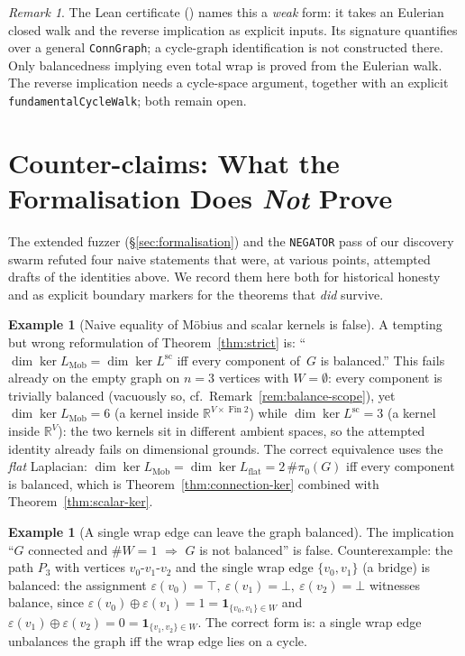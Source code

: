 \documentclass[11pt,a4paper]{amsart}
\theoremstyle{plain}
\theoremstyle{definition}
\newtheorem{example}[theorem]{Example}
\theoremstyle{remark}
\newtheorem{remark}[theorem]{Remark}
\DeclareMathOperator{\Ker}{ker}
\newcommand{\RR}{\mathbb{R}}
\newcommand{\Lscalar}{L^{\operatorname{sc}}}
\newcommand{\comp}{\pi_0}
\begin{document}
\begin{remark}\label{rem:cycle-ew-lean}
The Lean certificate
() names this a \emph{weak} form: it
takes an Eulerian closed walk and the reverse implication as explicit
inputs. Its signature quantifies over a general \texttt{ConnGraph};
a cycle-graph identification is not constructed there.
Only balancedness implying even total wrap is proved from the Eulerian
walk. The reverse implication needs a cycle-space argument, together
with an explicit \texttt{fundamentalCycleWalk}; both remain open.
\end{remark}

\section{Counter-claims: What the Formalisation Does
\emph{Not} Prove}\label{sec:counter}

The extended fuzzer (\S\ref{sec:formalisation}) and the
\texttt{NEGATOR} pass of our discovery swarm refuted four naive
statements that were, at various points, attempted drafts of the
identities above. We record them here both for historical honesty
and as explicit boundary markers for the theorems that \emph{did}
survive.

\begin{example}[Naive equality of M\"obius and scalar kernels is
false]\label{ex:naive-eq}
A tempting but wrong reformulation of Theorem~\ref{thm:strict} is:
``$\dim\Ker L_{\mathrm{Mob}} = \dim\Ker \Lscalar$ iff
every component of~$G$ is balanced.'' This fails already on the
empty graph on $n=3$ vertices with $W=\emptyset$: every
component is trivially balanced (vacuously so, cf.\
Remark~\ref{rem:balance-scope}), yet
$\dim\Ker L_{\mathrm{Mob}} = 6$ (a kernel inside
$\RR^{V\times\operatorname{Fin}2}$) while
$\dim\Ker \Lscalar = 3$ (a kernel inside $\RR^{V}$): the
two kernels sit in different ambient spaces, so the attempted
identity already fails on dimensional grounds. The correct
equivalence uses
the \emph{flat} Laplacian: $\dim\Ker L_{\mathrm{Mob}} =
\dim\Ker L_{\mathrm{flat}} = 2\,\#\comp(G)$ iff every component is
balanced, which is Theorem~\ref{thm:connection-ker} combined with
Theorem~\ref{thm:scalar-ker}.
\end{example}

\begin{example}[A single wrap edge can leave the graph
balanced]\label{ex:bridge-wrap}
The implication ``$G$ connected and $\#W=1$ $\Rightarrow$ $G$ is not
balanced'' is false. Counterexample: the path $P_3$ with vertices
$v_0\text{-}v_1\text{-}v_2$ and the single wrap edge
$\{v_0,v_1\}$ (a bridge) is balanced: the assignment
$\varepsilon(v_0)=\top,\ \varepsilon(v_1)=\bot,\
\varepsilon(v_2)=\bot$ witnesses balance, since
$\varepsilon(v_0)\oplus\varepsilon(v_1)=1=\mathbf{1}_{\{v_0,v_1\}\in W}$
and $\varepsilon(v_1)\oplus\varepsilon(v_2)=0=
\mathbf{1}_{\{v_1,v_2\}\in W}$. The correct form is: a single wrap
edge unbalances the graph iff the wrap edge lies on a cycle.
\end{example}
\end{document}
